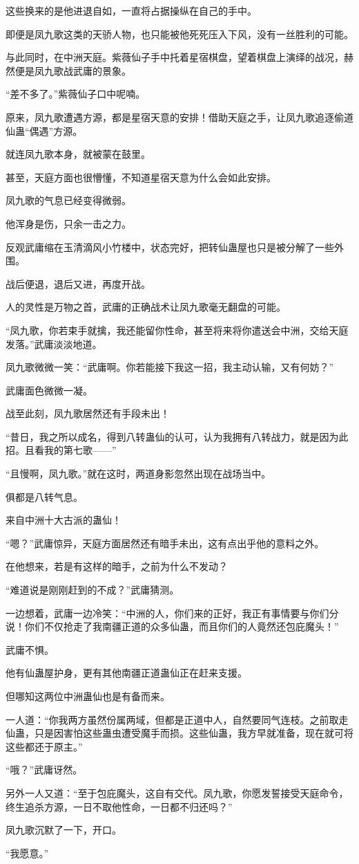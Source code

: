 \begin{this_body}
这些换来的是他进退自如，一直将占据操纵在自己的手中。

即便是凤九歌这类的天骄人物，也只能被他死死压入下风，没有一丝胜利的可能。

与此同时，在中洲天庭。紫薇仙子手中托着星宿棋盘，望着棋盘上演绎的战况，赫然便是凤九歌战武庸的景象。

“差不多了。”紫薇仙子口中呢喃。

原来，凤九歌遭遇方源，都是星宿天意的安排！借助天庭之手，让凤九歌追逐偷道仙蛊“偶遇”方源。

就连凤九歌本身，就被蒙在鼓里。

甚至，天庭方面也很懵懂，不知道星宿天意为什么会如此安排。

凤九歌的气息已经变得微弱。

他浑身是伤，只余一击之力。

反观武庸缩在玉清滴风小竹楼中，状态完好，把转仙蛊屋也只是被分解了一些外围。

战后便退，退后又进，再度开战。

人的灵性是万物之首，武庸的正确战术让凤九歌毫无翻盘的可能。

“凤九歌，你若束手就擒，我还能留你性命，甚至将来将你遣送会中洲，交给天庭发落。”武庸淡淡地道。

凤九歌微微一笑：“武庸啊。你若能接下我这一招，我主动认输，又有何妨？”

武庸面色微微一凝。

战至此刻，凤九歌居然还有手段未出！

“昔日，我之所以成名，得到八转蛊仙的认可，认为我拥有八转战力，就是因为此招。且看我的第七歌——”

“且慢啊，凤九歌。”就在这时，两道身影忽然出现在战场当中。

俱都是八转气息。

来自中洲十大古派的蛊仙！

“嗯？”武庸惊异，天庭方面居然还有暗手未出，这有点出乎他的意料之外。

在他想来，若是有这样的暗手，之前为什么不发动？

“难道说是刚刚赶到的不成？”武庸猜测。

一边想着，武庸一边冷笑：“中洲的人，你们来的正好，我正有事情要与你们分说！你们不仅抢走了我南疆正道的众多仙蛊，而且你们的人竟然还包庇魔头！”

武庸不惧。

他有仙蛊屋护身，更有其他南疆正道蛊仙正在赶来支援。

但哪知这两位中洲蛊仙也是有备而来。

一人道：“你我两方虽然份属两域，但都是正道中人，自然要同气连枝。之前取走仙蛊，只是因害怕这些蛊虫遭受魔手而损。这些仙蛊，我方早就准备，现在就可将这些都还于原主。”

“哦？”武庸讶然。

另外一人又道：“至于包庇魔头，这自有交代。凤九歌，你愿发誓接受天庭命令，终生追杀方源，一日不取他性命，一日都不归还吗？”

凤九歌沉默了一下，开口。

“我愿意。”

\end{this_body}

